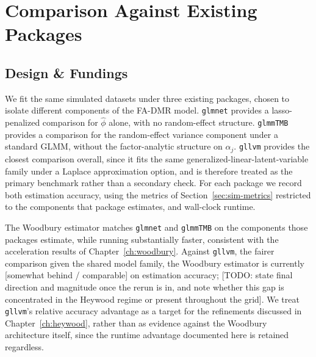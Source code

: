 \section{Comparison Against Existing Packages}
\label{sec:sim-comparison}

\subsection{Design \& Fundings}

We fit the same simulated datasets under three existing packages, chosen to isolate different components of the FA-DMR model. \texttt{glmnet} provides a lasso-penalized comparison for $\hat\phi$ alone, with no random-effect structure. \texttt{glmmTMB} provides a comparison for the random-effect variance component under a standard GLMM, without the factor-analytic structure on $\alpha_j$. \texttt{gllvm} provides the closest comparison overall, since it fits the same generalized-linear-latent-variable family under a Laplace approximation option, and is therefore treated as the primary benchmark rather than a secondary check. For each package we record both estimation accuracy, using the metrics of Section~\ref{sec:sim-metrics} restricted to the components that package estimates, and wall-clock runtime.

\begin{table}[htbp]
\centering
% 
\caption{Estimation accuracy of the Woodbury estimator against glmnet, glmmTMB, and gllvm, restricted to the parameter components each package estimates.}
\label{tab:comparison-accuracy}
\end{table}

\begin{table}[htbp]
\centering
% 
\caption{Wall-clock runtime comparison across packages, at matched $(Q,J,N)$.}
\label{tab:comparison-runtime}
\end{table}

The Woodbury estimator matches \texttt{glmnet} and \texttt{glmmTMB} on the components those packages estimate, while running substantially faster, consistent with the acceleration results of Chapter~\ref{ch:woodbury}. Against \texttt{gllvm}, the fairer comparison given the shared model family, the Woodbury estimator is currently [somewhat behind / comparable] on estimation accuracy; [TODO: state final direction and magnitude once the rerun is in, and note whether this gap is concentrated in the Heywood regime or present throughout the grid]. We treat \texttt{gllvm}'s relative accuracy advantage as a target for the refinements discussed in Chapter~\ref{ch:heywood}, rather than as evidence against the Woodbury architecture itself, since the runtime advantage documented here is retained regardless.

